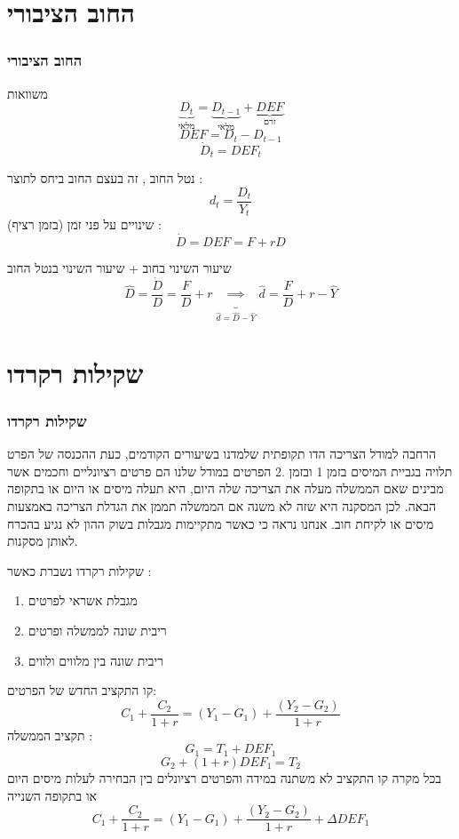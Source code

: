 \documentclass[usenames,dvipsnames]{beamer}
\begin{document}
\begin{RTL}
\section{החוב הציבורי}
\begin{frame}[allowframebreaks]
    \frametitle{החוב הציבורי}
    \begin{block}{משוואות}
        \begin{equation*}
            \underbrace{D_t}_{\text{מלאי}} = \underbrace{D_{t-1}}_{\text{מלאי}} + \underbrace{DEF}_{\text{זרם}}
        \end{equation*}
        \begin{equation*}
            DEF = D_t - D_{t-1}
        \end{equation*}
        \begin{equation*}
            \dot D_t = DEF_t
        \end{equation*}
    \end{block}

    נטל החוב , זה בעצם החוב ביחס לתוצר :
    \[d_t = \frac{D_t}{Y_t}\]
    שינויים על פני זמן (בזמן רציף) : 
    \[\dot D = DEF  = F + rD\]
    \begin{block}{שיעור השינוי בחוב + שיעור השינוי בנטל החוב }
    \[\widehat D = \frac{\dot D }{D } = \frac{F}{D} + r  \underbrace{\implies}_{\widehat d = \widehat D - \widehat Y} \widehat d  = \frac{F}{D} + r - \widehat{Y}\]
        
    \end{block}
\end{frame}
\section{שקילות רקרדו}
\begin{frame}[allowframebreaks]
    \frametitle{שקילות רקרדו}
    הרחבה למודל הצריכה הדו תקופתית שלמדנו בשיעורים הקודמים, כעת ההכנסה של הפרט תלויה
בגביית המיסים בזמן 1 ובזמן .2 הפרטים במודל שלנו הם פרטים רציונליים וחכמים אשר מבינים
שאם הממשלה מעלה את הצריכה שלה היום, היא תעלה מיסים או היום או בתקופה הבאה. לכן
המסקנה היא שזה לא משנה אם הממשלה תממן את הגדלת הצריכה באמצעות מיסים או לקיחת
חוב. אנחנו נראה כי כאשר מתקיימות מגבלות בשוק ההון לא נגיע בהכרח לאותן מסקנות.
    
\framebreak
\begin{alertblock}{שקילות רקרדו נשברת כאשר : }
    
\begin{enumerate}
    \item מגבלת אשראי לפרטים
    \item ריבית שונה לממשלה ופרטים
    \item ריבית שונה בין מלווים ולווים
\end{enumerate}
\end{alertblock}

\framebreak
קו התקציב החדש של הפרטים:
\[C_1 + \frac{C_2}{1+r} = (Y_1 - G_1) +\frac{(Y_2 - G_2)}{1+r} \]
תקציב הממשלה :
\[G_1 = T_1 + DEF_1\]
\[G_2  +(1+r)DEF_1 = T_2\]
בכל מקרה קו התקציב לא משתנה במידה והפרטים רציונלים בין הבחירה לעלות מיסים היום או בתקופה השנייה
\[C_1 + \frac{C_2}{1+r} = (Y_1 - G_1) +\frac{(Y_2 - G_2)}{1+r} + \Delta DEF_1 \]
\end{frame}
\end{RTL}
\end{document}
